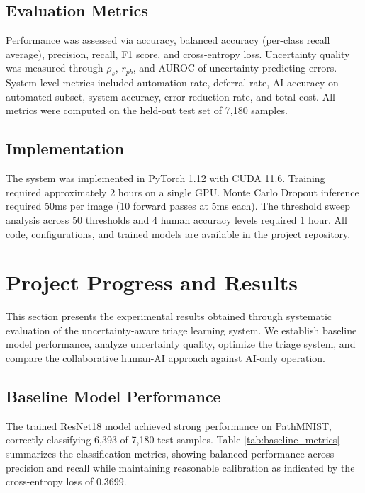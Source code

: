 \documentclass[10pt,a4paper]{article}
\begin{document}
\subsection{Evaluation Metrics}

Performance was assessed via accuracy, balanced accuracy (per-class recall average), precision, recall, F1 score, and cross-entropy loss. Uncertainty quality was measured through $\rho_s$, $r_{pb}$, and AUROC of uncertainty predicting errors. System-level metrics included automation rate, deferral rate, AI accuracy on automated subset, system accuracy, error reduction rate, and total cost. All metrics were computed on the held-out test set of 7,180 samples.

\subsection{Implementation}

The system was implemented in PyTorch 1.12 with CUDA 11.6. Training required approximately 2 hours on a single GPU. Monte Carlo Dropout inference required 50ms per image (10 forward passes at 5ms each). The threshold sweep analysis across 50 thresholds and 4 human accuracy levels required 1 hour. All code, configurations, and trained models are available in the project repository.
\section{Project Progress and Results}

This section presents the experimental results obtained through systematic evaluation of the uncertainty-aware triage learning system. We establish baseline model performance, analyze uncertainty quality, optimize the triage system, and compare the collaborative human-AI approach against AI-only operation.

\subsection{Baseline Model Performance}

The trained ResNet18 model achieved strong performance on PathMNIST, correctly classifying 6,393 of 7,180 test samples. Table \ref{tab:baseline_metrics} summarizes the classification metrics, showing balanced performance across precision and recall while maintaining reasonable calibration as indicated by the cross-entropy loss of 0.3699.
\end{document}
